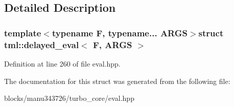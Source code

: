 \subsection{Detailed Description}
\subsubsection*{template$<$typename F, typename... A\+R\+G\+S$>$struct tml\+::delayed\+\_\+eval$<$ F, A\+R\+G\+S $>$}



Definition at line 260 of file eval.\+hpp.



The documentation for this struct was generated from the following file\+:\begin{DoxyCompactItemize}
\item 
blocks/manu343726/turbo\+\_\+core/eval.\+hpp\end{DoxyCompactItemize}
